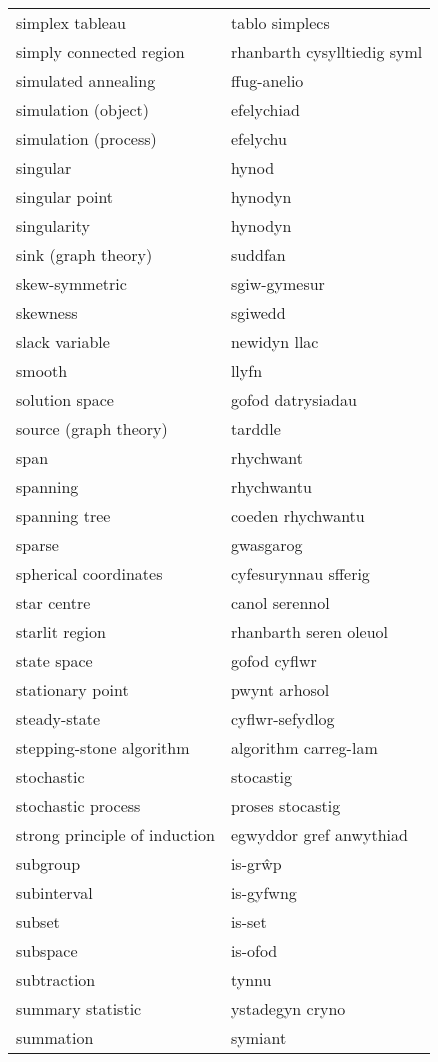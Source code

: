 \begin{supertabular}{p{0.22\textwidth}p{0.22\textwidth}}
simplex tableau & tablo simplecs \\
simply connected region & rhanbarth cysylltiedig syml \\
simulated annealing & ffug-anelio \\
simulation (object) & efelychiad \\
simulation (process) & efelychu \\
singular & hynod \\
singular point & hynodyn \\
singularity & hynodyn \\
sink (graph theory) & suddfan \\
skew-symmetric & sgiw-gymesur \\
skewness & sgiwedd \\
slack variable & newidyn llac \\
smooth & llyfn \\
solution space & gofod datrysiadau \\
source (graph theory) & tarddle \\
span & rhychwant \\
spanning & rhychwantu \\
spanning tree & coeden rhychwantu \\
sparse & gwasgarog \\
spherical coordinates & cyfesurynnau sfferig \\
star centre & canol serennol \\
starlit region & rhanbarth seren oleuol \\
state space & gofod cyflwr \\
stationary point & pwynt arhosol \\
steady-state & cyflwr-sefydlog \\
stepping-stone algorithm & algorithm carreg-lam \\
stochastic & stocastig \\
stochastic process & proses stocastig \\
strong principle of induction & egwyddor gref anwythiad \\
subgroup & is-grŵp \\
subinterval & is-gyfwng \\
subset & is-set \\
subspace & is-ofod \\
subtraction & tynnu \\
summary statistic & ystadegyn cryno \\
summation & symiant \\

\end{supertabular}
